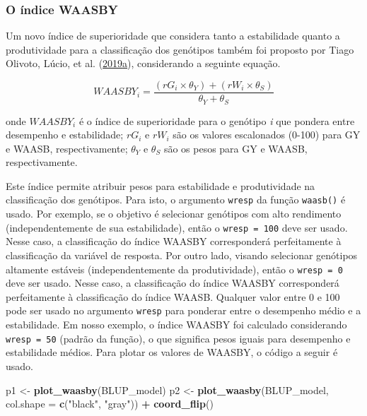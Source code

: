 \documentclass[
]{book}
\makeatletter
\newenvironment{Shaded}{\begin{snugshade}}{\end{snugshade}}
\newcommand{\DataTypeTok}[1]{\textcolor[rgb]{0.13,0.29,0.53}{#1}}
\newcommand{\KeywordTok}[1]{\textcolor[rgb]{0.13,0.29,0.53}{\textbf{#1}}}
\newcommand{\NormalTok}[1]{#1}
\newcommand{\OperatorTok}[1]{\textcolor[rgb]{0.81,0.36,0.00}{\textbf{#1}}}
\newcommand{\StringTok}[1]{\textcolor[rgb]{0.31,0.60,0.02}{#1}}
\numberwithin{equation}{section}
\newcommand{\indf}[1]{\index[function]{#1@\texttt{#1()}|ST}}
\makeatother
\begin{document}
\hypertarget{o-uxedndice-waasby}{%
\subsubsection{O índice WAASBY}\label{o-uxedndice-waasby}}

Um novo índice de superioridade que considera tanto a estabilidade quanto a produtividade para a classificação dos genótipos também foi proposto por Tiago Olivoto, Lúcio, et al. (\protect\hyperlink{ref-Olivoto2019}{2019}\protect\hyperlink{ref-Olivoto2019}{a}), considerando a seguinte equação.

\[
WAASB{Y_i} = \frac{{\left( {r{G_i} \times {\theta _Y}} \right) + \left( {r{W_i} \times {\theta _S}} \right)}}{{{\theta _Y} + {\theta _S}}}
\]

onde \(WAASBY_i\) é o índice de superioridade para o genótipo \emph{i} que pondera entre desempenho e estabilidade; \(rG_i\) e \(rW_i\) são os valores escalonados (0-100) para GY e WAASB, respectivamente; \(\theta_Y\) e \(\theta_S\) são os pesos para GY e WAASB, respectivamente.

Este índice permite atribuir pesos para estabilidade e produtividade na classificação dos genótipos. Para isto, o argumento \texttt{wresp} da função \texttt{waasb()} \indf{waasb} é usado. Por exemplo, se o objetivo é selecionar genótipos com alto rendimento (independentemente de sua estabilidade), então o \texttt{wresp\ =\ 100} deve ser usado. Nesse caso, a classificação do índice WAASBY corresponderá perfeitamente à classificação da variável de resposta. Por outro lado, visando selecionar genótipos altamente estáveis (independentemente da produtividade), então o \texttt{wresp\ =\ 0} deve ser usado. Nesse caso, a classificação do índice WAASBY corresponderá perfeitamente à classificação do índice WAASB. Qualquer valor entre 0 e 100 pode ser usado no argumento \texttt{wresp} para ponderar entre o desempenho médio e a estabilidade. Em nosso exemplo, o índice WAASBY foi calculado considerando \texttt{wresp\ =\ 50} (padrão da função), o que significa pesos iguais para desempenho e estabilidade médios. Para plotar os valores de WAASBY, o código a seguir é usado.

\begin{Shaded}
\begin{Highlighting}[]
\NormalTok{p1 \textless{}{-}}\StringTok{ }\KeywordTok{plot\_waasby}\NormalTok{(BLUP\_model)}
\NormalTok{p2 \textless{}{-}}\StringTok{ }\KeywordTok{plot\_waasby}\NormalTok{(BLUP\_model,}
                  \DataTypeTok{col.shape =} \KeywordTok{c}\NormalTok{(}\StringTok{"black"}\NormalTok{, }\StringTok{"gray"}\NormalTok{)) }\OperatorTok{+}
\StringTok{  }\KeywordTok{coord\_flip}\NormalTok{()}
\end{Highlighting}
\end{Shaded}
\end{document}
